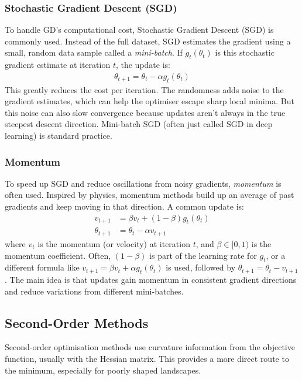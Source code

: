 \subsubsection{Stochastic Gradient Descent (SGD)}
To handle GD's computational cost, Stochastic Gradient Descent (SGD) is commonly used. Instead of the full dataset, SGD estimates the gradient using a small, random data sample called a \textit{mini-batch}. If $g_t(\theta_t)$ is this stochastic gradient estimate at iteration $t$, the update is:
\begin{align}
    \theta_{t+1} = \theta_t - \alpha g_t(\theta_t)
    \label{eq:sgd_update}
\end{align}
This greatly reduces the cost per iteration. The randomness adds noise to the gradient estimates, which can help the optimiser escape sharp local minima. But this noise can also slow convergence because updates aren't always in the true steepest descent direction. Mini-batch SGD (often just called SGD in deep learning) is standard practice.

\subsubsection{Momentum}
To speed up SGD and reduce oscillations from noisy gradients, \textit{momentum} is often used. Inspired by physics, momentum methods build up an average of past gradients and keep moving in that direction. A common update is:
\begin{align}
    v_{t+1} &= \beta v_t + (1-\beta) g_t(\theta_t) \label{eq:momentum_velocity} \\
    \theta_{t+1} &= \theta_t - \alpha v_{t+1} \label{eq:momentum_update}
\end{align}
where $v_t$ is the momentum (or velocity) at iteration $t$, and $\beta \in [0,1)$ is the momentum coefficient. Often, $(1-\beta)$ is part of the learning rate for $g_t$, or a different formula like $v_{t+1} = \beta v_t + \alpha g_t(\theta_t)$ is used, followed by $\theta_{t+1} = \theta_t - v_{t+1}$. The main idea is that updates gain momentum in consistent gradient directions and reduce variations from different mini-batches.

\subsection{Second-Order Methods}
\label{ssec:second_order_methods}

Second-order optimisation methods use curvature information from the objective function, usually with the Hessian matrix. This provides a more direct route to the minimum, especially for poorly shaped landscapes.


